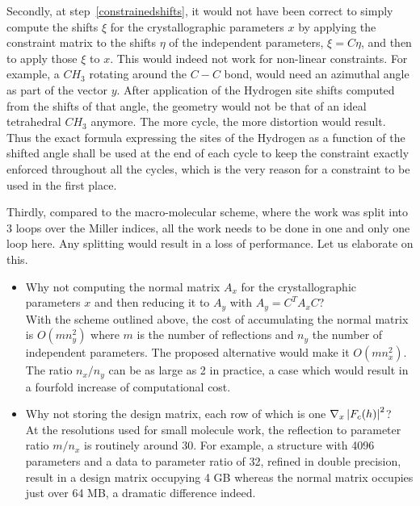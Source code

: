 \documentclass[12pt]{article}
\begin{document}
Secondly, at step~\ref{constrainedshifts}, it would not have been correct to simply compute the shifts $\xi$ for the crystallographic parameters $x$ by applying the constraint matrix to the shifts $\eta$ of the independent parameters, $\xi = C \eta$, and then to apply those $\xi$ to $x$. This would indeed not work for non-linear constraints. For example, a $CH_3$ rotating around the $C-C$ bond, would need an azimuthal angle as part of the vector $y$. After application of the Hydrogen site shifts computed from the shifts of that angle, the geometry would not be that of an ideal tetrahedral $CH_3$ anymore. The more cycle, the more distortion would result. Thus the exact formula expressing the sites of the Hydrogen as a function of the shifted angle shall be used at the end of each cycle to keep the constraint exactly enforced throughout all the cycles, which is the very reason for a constraint to be used in the first place.

Thirdly, compared to the macro-molecular scheme, where the work was split into 3 loops over the Miller indices, all the work needs to be done in one and only one loop here. Any splitting would result in a loss of performance. Let us elaborate on this.
\begin{itemize}
\item Why not computing the normal matrix $A_x$ for the crystallographic parameters $x$ and then reducing it to $A_y$ with $A_y = C^T A_x C$?\\
With the scheme outlined above, the cost of accumulating the normal matrix is $O(m n_y^2)$ where $m$ is the number of reflections and $n_y$ the number of independent parameters. The proposed alternative would make it $O(m n_x^2)$. The ratio $n_x/n_y$ can be as large as 2 in practice, a case which would result in a fourfold increase of computational cost.
\item Why not storing the design matrix, each row of which is one $\nabla_x \left| F_c(h) \right|^2$?\\
At the resolutions used for small molecule work, the reflection to parameter ratio $m/n_x$ is routinely around 30. For example, a structure with 4096 parameters and a data to parameter ratio of 32, refined in double precision, result in a design matrix occupying 4 GB whereas the normal matrix occupies just over 64 MB, a dramatic difference indeed.
\end{itemize}
\end{document}
